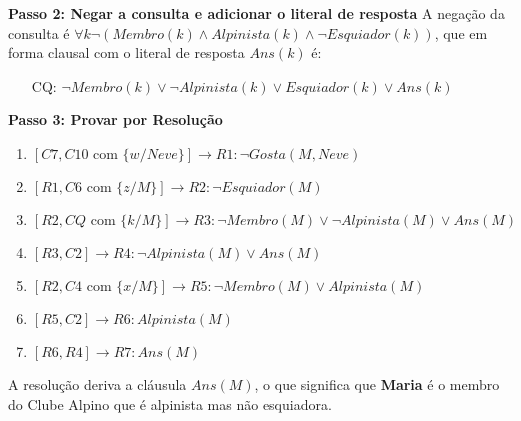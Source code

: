 \documentclass{article}
\begin{document}
\newpage
\textbf{Passo 2: Negar a consulta e adicionar o literal de resposta}
A negação da consulta é $\forall k \neg(Membro(k) \wedge Alpinista(k) \wedge \neg Esquiador(k))$, que em forma clausal com o literal de resposta $Ans(k)$ é:
\begin{itemize}
    \item[CQ:] $\neg Membro(k) \vee \neg Alpinista(k) \vee Esquiador(k) \vee Ans(k)$
\end{itemize}

\textbf{Passo 3: Provar por Resolução}
\begin{enumerate}
    \item $[C7, C10 \text{ com } \{w/Neve\}] \rightarrow R1: \neg Gosta(M, Neve)$
    \item $[R1, C6 \text{ com } \{z/M\}] \rightarrow R2: \neg Esquiador(M)$
    \item $[R2, CQ \text{ com } \{k/M\}] \rightarrow R3: \neg Membro(M) \vee \neg Alpinista(M) \vee Ans(M)$
    \item $[R3, C2] \rightarrow R4: \neg Alpinista(M) \vee Ans(M)$
    \item $[R2, C4 \text{ com } \{x/M\}] \rightarrow R5: \neg Membro(M) \vee Alpinista(M)$
    \item $[R5, C2] \rightarrow R6: Alpinista(M)$
    \item $[R6, R4] \rightarrow R7: Ans(M)$
\end{enumerate}

A resolução deriva a cláusula $Ans(M)$, o que significa que \textbf{Maria} é o membro do Clube Alpino que é alpinista mas não esquiadora.
\end{document}
